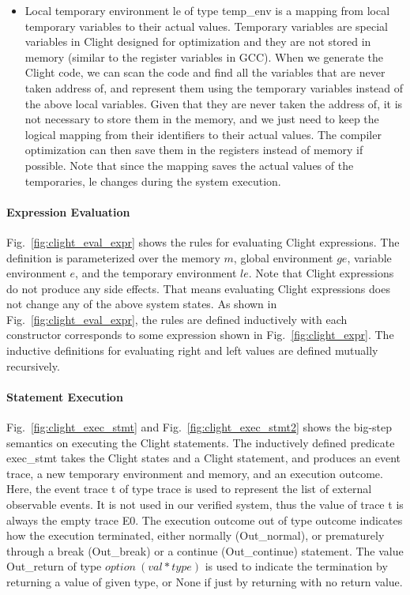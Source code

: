 \begin{itemize}[leftmargin=*]
\item Local temporary environment \textsf{le} of type \textsf{temp\_env} is
a mapping from local temporary variables to their actual values. Temporary
variables are special variables in Clight designed for optimization and
they are not stored in memory (similar to the register variables in GCC).
When we generate the Clight code, we can scan the code and find
all the variables that are never taken address of, and represent
them using the temporary variables
instead of the above local variables. Given that they are never taken the
address of, it is not necessary to store them in the memory, and we just need
to keep the logical mapping from their identifiers to their actual values.
The compiler optimization can then save them in the registers instead of memory
if possible. Note that since the mapping saves the actual values of the temporaries,
\textsf{le} changes during the system execution.


\end{itemize}


\paragraph{Expression Evaluation}
Fig.~\ref{fig:clight_eval_expr} shows the rules for evaluating Clight
expressions. The definition is parameterized over the memory $m$,
global environment $ge$, variable environment $e$, and the temporary
environment $le$. Note that Clight expressions do not produce any
side effects. That means evaluating Clight expressions does not
change any of the above system states.
As shown in Fig.~\ref{fig:clight_eval_expr}, the rules are defined inductively
with each constructor corresponds to some expression shown in Fig.~\ref{fig:clight_expr}.
The inductive definitions for evaluating right and left values are defined
mutually recursively.

\paragraph{Statement Execution}
Fig.~\ref{fig:clight_exec_stmt} and Fig.~\ref{fig:clight_exec_stmt2}
shows the big-step semantics on executing the Clight statements.
The inductively defined predicate \textsf{exec\_stmt} takes
the Clight states and a Clight statement, and produces
an event trace, a new temporary environment and memory, and
an execution outcome. Here, the event trace \textsf{t} of type
\textsf{trace} is used to represent the list
of external observable events. It is not used in our verified system, thus
the value of trace \textsf{t} is always the empty trace \textsf{E0}.
The execution outcome \textsf{out} of type \textsf{outcome} indicates how
the execution terminated, either normally (\textsf{Out\_normal}), or prematurely
through a break (\textsf{Out\_break}) or a continue (\textsf{Out\_continue})
statement. The value \textsf{Out\_return} of type $option~(val * type)$ is used to indicate
the termination by returning a value of given type, or \textsf{None} if
just by returning with no return value.

